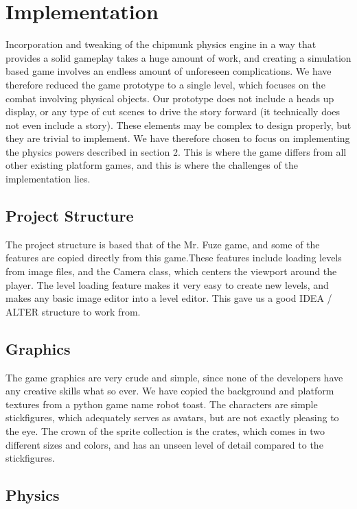 \section{Implementation} %
Incorporation and tweaking of the chipmunk physics engine in a way that provides a solid gameplay takes a huge amount of work, and creating a simulation based game involves an endless amount of unforeseen complications. We have therefore reduced the game prototype to a single level, which focuses on the combat involving physical objects. Our prototype does not include a heads up display, or any type of cut scenes to drive the story forward (it technically does not even include a story). These elements may be complex to design properly, but they are trivial to implement. We have therefore chosen to focus on implementing the physics powers described in section 2. This is where the game differs from all other existing platform games, and this is where the challenges of the implementation lies.
\subsection{Project Structure}

The project structure is based that of the Mr. Fuze game, and some of the features are copied directly from this game.These features include loading levels from image files, and the Camera class, which centers the viewport around the player. The level loading feature makes it very easy to create new levels, and makes any basic image editor into a level editor. This gave us a good IDEA / ALTER structure to work from.

\subsection{Graphics}
The game graphics are very crude and simple, since none of the developers have any creative skills what so ever. We have copied the background and platform textures from a python game name robot toast. The characters are simple stickfigures, which adequately serves as avatars, but are not exactly pleasing to the eye. The crown of the sprite collection is the crates, which comes in two different sizes and colors, and has an unseen level of detail compared to the stickfigures.

\subsection{Physics}

